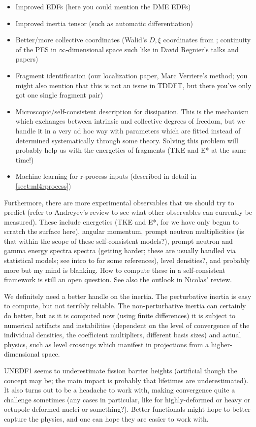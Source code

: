 \begin{itemize}
	\item Improved EDFs (here you could mention the DME EDFs)
	\item Improved inertia tensor (such as automatic differentiation)
	\item Better/more collective coordinates (Walid's $D, \xi$ coordinates from \cite{Younes2012}; continuity of the PES in $\infty$-dimensional space such like in David Regnier's talks and papers)
	\item Fragment identification (our localization paper, Marc Verriere's method; you might also mention that this is not an issue in TDDFT, but there you've only got one single fragment pair)
	\item Microscopic/self-consistent description for dissipation. This is the mechanism which exchanges between intrinsic and collective degrees of freedom, but we handle it in a very ad hoc way with parameters which are fitted instead of determined systematically through some theory. Solving this problem will probably help us with the energetics of fragments (TKE and E* at the same time!)
	\item Machine learning for r-process inputs (described in detail in \ref{sect:ml4rprocess})
\end{itemize}

Furthermore, there are more experimental observables that we should try to predict (refer to Andreyev's review to see what other observables can currently be measured). These include energetics (TKE and E*, for we have only begun to scratch the surface here), angular momentum, prompt neutron multiplicities (is that within the scope of these self-consistent models?), prompt neutron and gamma energy spectra spectra (getting harder; these are usually handled via statistical models; see intro to \cite{Schmidt2018} for some references), level densities?, and probably more but my mind is blanking. How to compute these in a self-consistent framework is still an open question. See also the outlook in Nicolas' review.

We definitely need a better handle on the inertia. The perturbative inertia is easy to compute, but not terribly reliable. The non-perturbative inertia can certainly do better, but as it is computed now (using finite differences) it is subject to numerical artifacts and instabilities (dependent on the level of convergence of the individual densities, the coefficient multipliers, different basis sizes) and actual physics, such as level crossings which manifest in projections from a higher-dimensional space.

UNEDF1 seems to underestimate fission barrier heights (artificial though the concept may be; the main impact is probably that lifetimes are underestimated). It also turns out to be a headache to work with, making convergence quite a challenge sometimes (any cases in particular, like for highly-deformed or heavy or octupole-deformed nuclei or something?). Better functionals might hope to better capture the physics, and one can hope they are easier to work with.